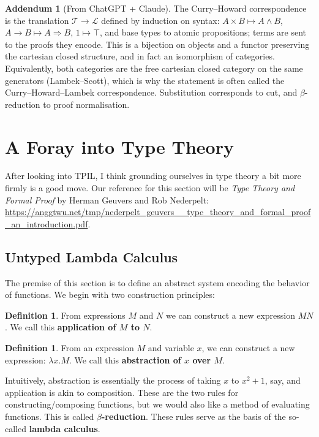 \documentclass{article}
\theoremstyle{definition}
\newtheorem{definition} [theorem] {Definition}
\newtheorem{addendum}{Addendum}
\newcommand{\1}{\mathbb{1}}
\newcommand{\0}{\mathbb{0}}
\begin{document}
\begin{addendum}[From ChatGPT + Claude]
The Curry--Howard correspondence is the translation $\mathcal{T}\to\mathcal{L}$
defined by induction on syntax: $A\times B\mapsto A\wedge B$,
$A\to B\mapsto A\Rightarrow B$, $1\mapsto\top$, and base types to atomic
propositions; terms are sent to the proofs they encode. This is a bijection on
objects and a functor preserving the cartesian closed structure, and in fact an
isomorphism of categories. Equivalently, both categories are the free cartesian
closed category on the same generators (Lambek--Scott), which is why the
statement is often called the Curry--Howard--Lambek correspondence.
Substitution corresponds to cut, and $\beta$-reduction to proof normalisation.
\end{addendum}

\section{A Foray into Type Theory}

After looking into TPIL, I think grounding ourselves in type theory a bit more firmly is a good move. Our reference for this section will be \textit{Type Theory and Formal Proof} by Herman Geuvers and Rob Nederpelt: \url{https://anggtwu.net/tmp/nederpelt_geuvers__type_theory_and_formal_proof_an_introduction.pdf}. 

\subsection{Untyped Lambda Calculus}

The premise of this section is to define an abstract system encoding the behavior of functions. We begin with two construction principles:
\begin{definition}
    From expressions $M$ and $N$ we can construct a new expression $MN$. We call this \textbf{application of $M$ to $N$}. 
\end{definition}
\begin{definition}
    From an expression $M$ and variable $x$, we can construct a new expression: $\lambda x.M$. We call this \textbf{abstraction of $x$ over $M$}.
\end{definition}
Intuitively, abstraction is essentially the process of taking $x$ to $x^2 + 1$, say, and application is akin to composition. These are the two rules for constructing/composing functions, but we would also like a method of evaluating functions. This is called \textbf{$\beta$-reduction}. These rules serve as the basis of the so-called \textbf{lambda calculus}.
\end{document}
